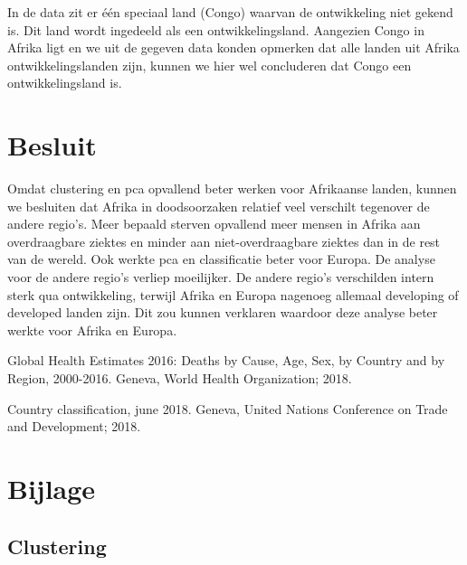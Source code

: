 \documentclass[a4paper,kulak]{kulakarticle}
\begin{document}
In de data zit er \'e\'en speciaal land (Congo) waarvan de ontwikkeling niet gekend is. Dit land wordt ingedeeld als een ontwikkelingsland. Aangezien Congo in Afrika ligt en we uit de gegeven data konden opmerken dat alle landen uit Afrika ontwikkelingslanden zijn, kunnen we hier wel concluderen dat Congo een ontwikkelingsland is. 


\section*{Besluit}

Omdat clustering en pca opvallend beter werken voor Afrikaanse landen, kunnen we besluiten dat Afrika in doodsoorzaken relatief veel verschilt tegenover de andere regio's.
Meer bepaald sterven opvallend meer mensen in Afrika aan overdraagbare ziektes en minder aan niet-overdraagbare ziektes dan in de rest van de wereld. 
Ook werkte pca en classificatie beter voor Europa.
De analyse voor de andere regio's verliep moeilijker.
De andere regio's verschilden intern sterk qua ontwikkeling, terwijl Afrika en Europa nagenoeg allemaal developing of developed landen zijn.
Dit zou kunnen verklaren waardoor deze analyse beter werkte voor Afrika en Europa.

\begin{thebibliography}{9}
	
	Global Health Estimates 2016: Deaths by Cause, Age, Sex, by Country and by Region, 2000-2016.
	Geneva, World Health Organization; 2018.
	
	Country classification, june 2018. Geneva, United Nations Conference on Trade and Development;
	2018.
	
\end{thebibliography}

\newpage
\section{Bijlage} \label{b}
\subsection{Clustering}
\end{document}
